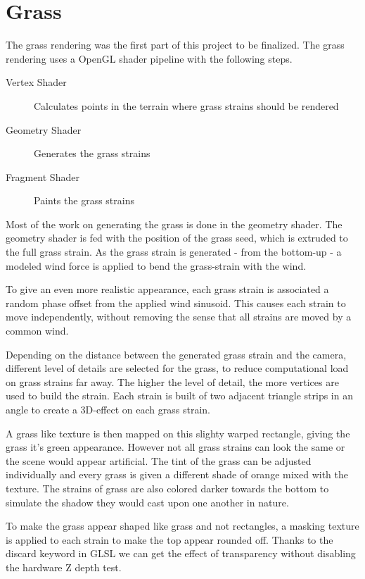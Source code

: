 \section{Grass}
\label{cha:grass}
The grass rendering was the first part of this project to be finalized.
The grass rendering uses a OpenGL shader pipeline with the following steps.
\begin{description}
    \item[Vertex Shader] Calculates points in the terrain where grass strains should be rendered
    \item[Geometry Shader] Generates the grass strains
    \item[Fragment Shader] Paints the grass strains
\end{description}

Most of the work on generating the grass is done in the geometry shader.
The geometry shader is fed with the position of the grass seed, which
is extruded to the full grass strain. As the grass strain is generated - from the bottom-up -
a modeled wind force is applied to bend the grass-strain with the wind.

To give an even more realistic appearance, each grass strain is associated a
random phase offset from the applied wind sinusoid.
This causes each strain to move independently, without removing the sense
that all strains are moved by a common wind.


Depending on the distance between the generated grass strain and the camera,
different level of details are selected for the grass, to reduce computational
load on grass strains far away. The higher the level of detail, the more vertices are
used to build the strain. Each strain is built of two adjacent triangle strips in an angle
to create a 3D-effect on each grass strain.

A grass like texture is then mapped on this slighty warped rectangle, giving the grass it's green appearance.
However not all grass strains can look the same or the scene would appear artificial.
The tint of the grass can be adjusted individually and every grass is given a different shade of orange mixed with the texture. The strains of grass are also colored darker towards the bottom to simulate the shadow they would cast upon one another in nature.

To make the grass appear shaped like grass and not rectangles, a masking texture is applied to each strain to make the top appear rounded off. Thanks to the discard keyword in GLSL we can get the effect of transparency without disabling the hardware Z depth test.



